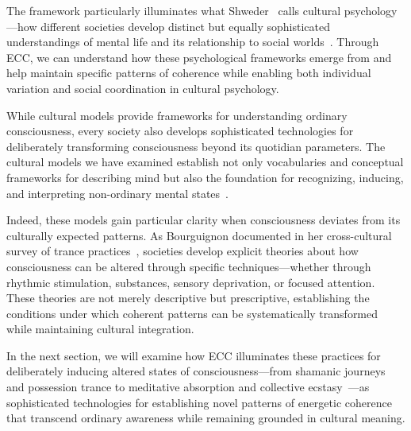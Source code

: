 The framework particularly illuminates what Shweder~\cite{shweder1991thinking} calls cultural psychology—how different societies develop distinct but equally sophisticated understandings of mental life and its relationship to social worlds~\cite{tomasello1999cultural}. Through ECC, we can understand how these psychological frameworks emerge from and help maintain specific patterns of coherence while enabling both individual variation and social coordination in cultural psychology.

While cultural models provide frameworks for understanding ordinary consciousness, every society also develops sophisticated technologies for deliberately transforming consciousness beyond its quotidian parameters. The cultural models we have examined establish not only vocabularies and conceptual frameworks for describing mind but also the foundation for recognizing, inducing, and interpreting non-ordinary mental states~\cite{bourguignon1973religion,goodman1988ecstasy}.

Indeed, these models gain particular clarity when consciousness deviates from its culturally expected patterns. As Bourguignon documented in her cross-cultural survey of trance practices~\cite{bourguignon1976possession}, societies develop explicit theories about how consciousness can be altered through specific techniques—whether through rhythmic stimulation, substances, sensory deprivation, or focused attention. These theories are not merely descriptive but prescriptive, establishing the conditions under which coherent patterns can be systematically transformed while maintaining cultural integration.

In the next section, we will examine how ECC illuminates these practices for deliberately inducing altered states of consciousness—from shamanic journeys and possession trance to meditative absorption and collective ecstasy~\cite{winkelman2010shamanism,rouget1985music}—as sophisticated technologies for establishing novel patterns of energetic coherence~ that transcend ordinary awareness while remaining grounded in cultural meaning.
